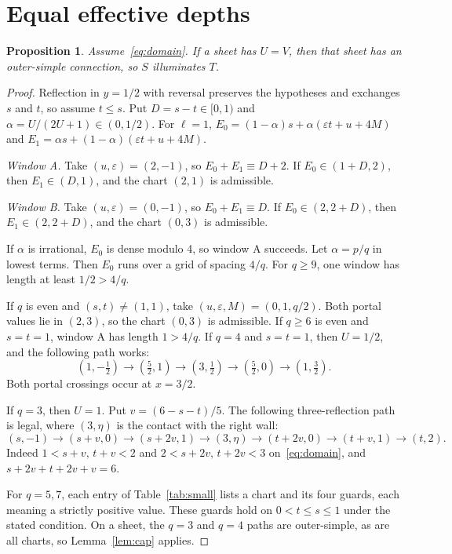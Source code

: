 \documentclass[11pt]{article}
\newtheorem{proposition}{Proposition}
\theoremstyle{remark}
\begin{document}
\section{Equal effective depths}\label{sec:equal}
\begin{proposition}\label{prop:equal}
Assume~\eqref{eq:domain}. If a sheet has $U=V$, then that sheet has an outer-simple connection, so $S$ illuminates $T$.
\end{proposition}
\begin{proof}
Reflection in $y=1/2$ with reversal preserves the hypotheses and exchanges $s$ and $t$, so assume $t\le s$. Put $D=s-t\in[0,1)$ and $\alpha=U/(2U+1)\in(0,1/2)$. For $\ell=1$, $E_0=(1-\alpha)s+\alpha(\varepsilon t+u+4M)$ and $E_1=\alpha s+(1-\alpha)(\varepsilon t+u+4M)$.

\emph{Window A.} Take $(u,\varepsilon)=(2,-1)$, so $E_0+E_1\equiv D+2$. If $E_0\in(1+D,2)$, then $E_1\in(D,1)$, and the chart $(2,1)$ is admissible.

\emph{Window B.} Take $(u,\varepsilon)=(0,-1)$, so $E_0+E_1\equiv D$. If $E_0\in(2,2+D)$, then $E_1\in(2,2+D)$, and the chart $(0,3)$ is admissible.

If $\alpha$ is irrational, $E_0$ is dense modulo 4, so window A succeeds. Let $\alpha=p/q$ in lowest terms. Then $E_0$ runs over a grid of spacing $4/q$. For $q\ge 9$, one window has length at least $1/2>4/q$.

If $q$ is even and $(s,t)\ne(1,1)$, take $(u,\varepsilon,M)=(0,1,q/2)$. Both portal values lie in $(2,3)$, so the chart $(0,3)$ is admissible. If $q\ge6$ is even and $s=t=1$, window A has length $1>4/q$. If $q=4$ and $s=t=1$, then $U=1/2$, and the following path works:
\[
(1,-\tfrac12)\to(\tfrac52,1)\to(3,\tfrac12)\to(\tfrac52,0)\to(1,\tfrac32).
\]
Both portal crossings occur at $x=3/2$.

If $q=3$, then $U=1$. Put $v=(6-s-t)/5$. The following three-reflection path is legal, where $(3,\eta)$ is the contact with the right wall:
\[
(s,-1)\to(s+v,0)\to(s+2v,1)\to(3,\eta)\to(t+2v,0)\to(t+v,1)\to(t,2).
\]
Indeed $1<s+v,\,t+v<2$ and $2<s+2v,\,t+2v<3$ on~\eqref{eq:domain}, and $s+2v+t+2v+v=6$.

For $q=5,7$, each entry of Table~\ref{tab:small} lists a chart and its four guards, each meaning a strictly positive value. These guards hold on $0<t\le s\le1$ under the stated condition. On a sheet, the $q=3$ and $q=4$ paths are outer-simple, as are all charts, so Lemma~\ref{lem:cap} applies.
\end{proof}
\end{document}
